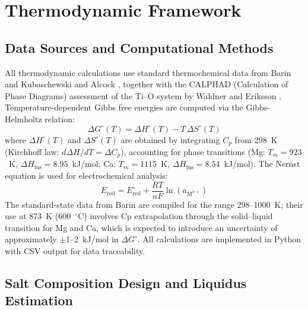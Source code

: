 \documentclass[11pt]{article}
\begin{document}
\section*{Thermodynamic Framework}

\subsection*{Data Sources and Computational Methods}
\label{subsec:data}

All thermodynamic calculations use standard thermochemical data from Barin \cite{barin1995} and Kubaschewski and Alcock \cite{kubaschewski1979}, together with the CALPHAD (Calculation of Phase Diagrams) assessment of the Ti--O system by Waldner and Eriksson \cite{waldner1999}. Temperature-dependent Gibbs free energies are computed via the Gibbs-Helmholtz relation:
\begin{equation}
\label{eq:gibbs}
\Delta G^{\circ}(T) = \Delta H^{\circ}(T) - T\,\Delta S^{\circ}(T)
\end{equation}
where $\Delta H^{\circ}(T)$ and $\Delta S^{\circ}(T)$ are obtained by integrating $C_p$ from 298~K (Kirchhoff law: $d\Delta H/dT = \Delta C_p$), accounting for phase transitions (Mg: $T_m=923$~K, $\Delta H_{\mathrm{fus}}=8.95$~kJ/mol; Ca: $T_m=1115$~K, $\Delta H_{\mathrm{fus}}=8.54$~kJ/mol). The Nernst equation is used for electrochemical analysis:
\begin{equation}
\label{eq:nernst}
E_{\mathrm{red}} = E^{\circ}_{\mathrm{red}} + \frac{RT}{nF}\ln(a_{\mathrm{M}^{n+}})
\end{equation}
The standard-state data from Barin \cite{barin1995} are compiled for the range 298--1000~K; their use at 873~K (600~$^{\circ}$C) involves Cp extrapolation through the solid--liquid transition for Mg and Ca, which is expected to introduce an uncertainty of approximately $\pm$1--2~kJ/mol in $\Delta G^{\circ}$. All calculations are implemented in Python with CSV output for data traceability.

\subsection*{Salt Composition Design and Liquidus Estimation}
\end{document}
